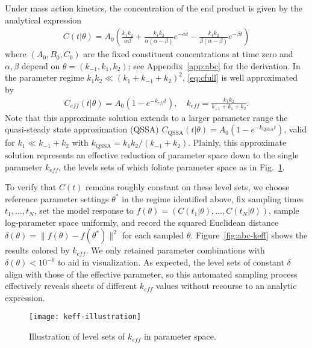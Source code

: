 Under mass action kinetics, the concentration of the end product is
given by the analytical expression
% 
\begin{align}
  C(t|\theta)
  =
  A_0
  \left(
  \frac{k_1 k_2}{\alpha \beta}
  +
  \frac{k_1 k_2}{\alpha(\alpha - \beta)}
  e^{-\alpha t}
  -
  \frac{k_1 k_2}{\beta(\alpha - \beta)}
  e^{-\beta t}
  \right)
  \label{eq:cfull}
\end{align}
% 
where $(A_0,B_0,C_0)$ are the fixed constituent concentrations at time
zero and $\alpha,\beta$ depend on $\theta=(k_{-1},k_1,k_2)$; see
Appendix~\ref{app:abc} for the derivation. In the parameter regime
$k_1 k_2 \ll (k_1 + k_{-1} + k_2)^2$, \eqref{eq:cfull} is well
approximated by
% 
\begin{align}
  C_{eff}(t|\theta)
  =
  A_0
  \left(
  1 - e^{-k_{eff} t}
  \right) ,
  \quad
  k_{eff}
  =
  \frac{k_1 k_2}{k_{-1} + k_1 + k_2} .
  \label{eq:abc-qssa}
\end{align}
% 
Note that this approximate solution extends to a larger parameter
range the quasi-steady state approximation (QSSA)
$C_\mathrm{QSSA}(t|\theta) = A_0 (1 - e^{-k_\mathrm{QSSA} t})$, valid
for $k_1 \ll k_{-1} + k_2$ with
$k_\mathrm{QSSA}=k_1 k_2/(k_{-1} + k_2)$.  Plainly, this approximate
solution represents an effective reduction of parameter space down to
the single parameter $k_{eff}$, the levels sets of which foliate
parameter space as in Fig.~\ref{fig:abc-ill}.

To verify that $C(t)$ remains roughly constant on these level sets, we
choose reference parameter settings $\theta^*$ in the regime
identified above, fix sampling times $t_1,\ldots,t_N$, set the model
response to $f(\theta)=( C(t_1|\theta) , \ldots , C(t_N|\theta) )$,
sample log-parameter space uniformly, and record the squared Euclidean
distance $\delta(\theta) = \| f(\theta) - f(\theta^*) \|^2$ for each
sampled $\theta$.  Figure~\ref{fig:abc-keff} shows the results colored
by $k_{eff}$. We only retained parameter combinations with
$\delta(\theta) < 10^{-6}$ to aid in visualization. As expected, the
level sets of constant $\delta$ align with those of the effective
parameter, so this automated sampling process effectively reveals
sheets of different $k_{eff}$ values without recourse to an analytic
expression.

\begin{figure}[!htp]
  \centering
  \texttt{[image: keff-illustration]}
  \caption[Illustration of level sets of the effective parameter in a
  model of chemical kinetics]{Illustration of level sets of $k_{eff}$
    in parameter space. \label{fig:abc-ill}}
\end{figure}


